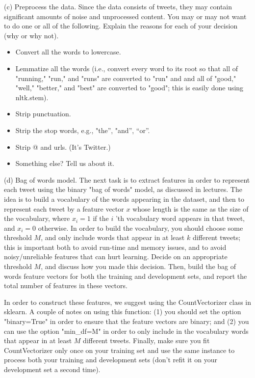 \documentclass[10pt]{article}
\begin{document}
(c) Preprocess the data. Since the data consists of tweets, they may contain significant amounts of noise and unprocessed content. You may or may not want to do one or all of the following. Explain the reasons for each of your decision (why or why not).

\begin{itemize}
  \item Convert all the words to lowercase.

  \item Lemmatize all the words (i.e., convert every word to its root so that all of "running," "run," and "runs" are converted to "run" and and all of "good," "well," "better," and "best" are converted to "good"; this is easily done using nltk.stem).

  \item Strip punctuation.

  \item Strip the stop words, e.g., "the”, "and”, “or”.

  \item Strip @ and urls. (It’s Twitter.)

  \item Something else? Tell us about it.

\end{itemize}

(d) Bag of words model. The next task is to extract features in order to represent each tweet using the binary "bag of words" model, as discussed in lectures. The idea is to build a vocabulary of the words appearing in the dataset, and then to represent each tweet by a feature vector $x$ whose length is the same as the size of the vocabulary, where $x_{i}=1$ if the $i$ 'th vocabulary word appears in that tweet, and $x_{i}=0$ otherwise. In order to build the vocabulary, you should choose some threshold $M$, and only include words that appear in at least $k$ different tweets; this is important both to avoid run-time and memory issues, and to avoid noisy/unreliable features that can hurt learning. Decide on an appropriate threshold $M$, and discuss how you made this decision. Then, build the bag of words feature vectors for both the training and development sets, and report the total number of features in these vectors.

In order to construct these features, we suggest using the CountVectorizer class in sklearn. A couple of notes on using this function: (1) you should set the option "binary=True" in order to ensure that the feature vectors are binary; and (2) you can use the option "min\_df=M" in order to only include in the vocabulary words that appear in at least $M$ different tweets. Finally, make sure you fit CountVectorizer only once on your training set and use the same instance to process both your training and development sets (don't refit it on your development set a second time).
\end{document}
